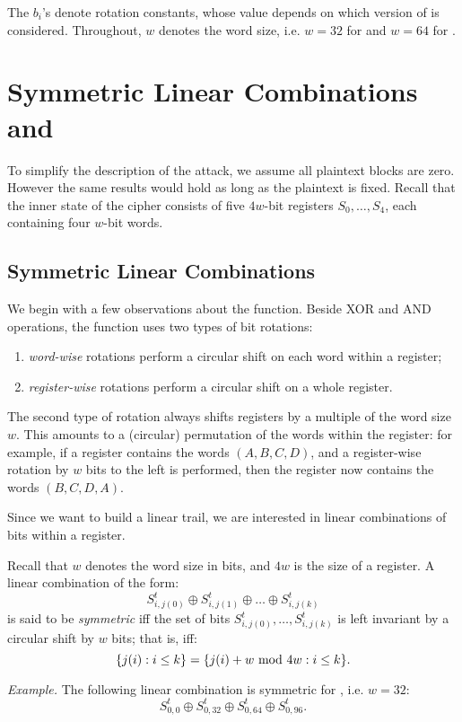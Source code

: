 \documentclass{llncs}
\begin{document}
The $b_i$'s denote rotation constants, whose value depends on which version of  is considered. Throughout, $w$ denotes the  word size, i.e. $w=32$ for  and $w=64$ for .

\section{Symmetric Linear Combinations and }
\label{sec:introminimorus}

To simplify the description of the attack, we assume all plaintext blocks are zero. However the same results would hold as long as the plaintext is fixed. Recall that the inner state of the cipher consists of five $4w$-bit registers $S_0,\dots,S_4$, each containing four $w$-bit words.

\subsection{Symmetric Linear Combinations}

We begin with a few observations about the \StateUpdate{} function. Beside XOR and AND operations, the \StateUpdate{} function uses two types of bit rotations:
\begin{enumerate}
\item \emph{word-wise} rotations perform a circular shift on each word within a register;
\item \emph{register-wise} rotations perform a circular shift on a whole register.
\end{enumerate}
The second type of rotation always shifts registers by a multiple of the word size $w$. This amounts to a (circular) permutation of the words within the register: for example, if a register contains the words $(A, B, C, D)$, and a register-wise rotation by $w$ bits to the left is performed, then the register now contains the words $(B, C, D, A)$.

Since we want to build a linear trail, we are interested in linear combinations of bits within a register.
\begin{definition}
Recall that $w$ denotes the word size in bits, and $4w$ is the size of a register. A linear combination of the form:
\[
S^t_{i,j(0)} \oplus S^t_{i,j(1)} \oplus \dots \oplus S^t_{i,j(k)}
\]
is said to be \emph{symmetric} iff the set of bits $S^t_{i,j(0)}, \dots, S^t_{i,j(k)}$ is left invariant by a circular shift by $w$ bits; that is, iff:
\[
\{j(i) : i\leq k\} = \{j(i) + w \text{\rm{} mod } 4w : i\leq k\}.
\]
\end{definition}
\emph{Example.} The following linear combination is symmetric for , i.e. $w = 32$:
\begin{equation}
S^t_{0,0} \oplus S^t_{0,32} \oplus S^t_{0,64} \oplus S^t_{0,96}.
\label{eq:symmetric}
\end{equation}
\end{document}
